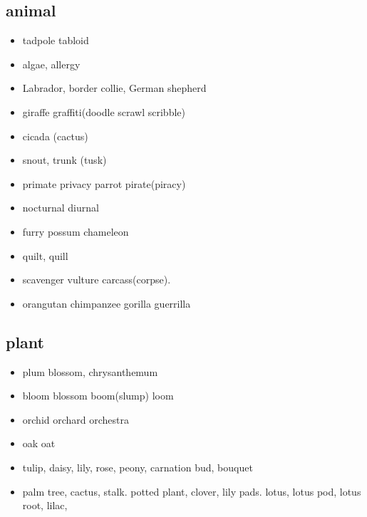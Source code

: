 \documentclass[a4paper,11pt,twoside]{book}
\begin{document}
\subsection{animal}
\begin{itemize}
	\item tadpole tabloid
	
	\item algae, allergy 
	
	\item Labrador, border collie, German shepherd
	\item giraffe graffiti(doodle scrawl scribble) 
	
	\item cicada (cactus)
	
	\item snout, trunk (tusk)
	
	\item primate privacy parrot pirate(piracy)
		
	\item nocturnal diurnal
		
	\item furry possum chameleon 
	
	\item quilt, quill
	
	\item scavenger vulture carcass(corpse).
	
	\item orangutan chimpanzee gorilla guerrilla 
\end{itemize}

\subsection{plant}
\begin{itemize}
	\item plum blossom, chrysanthemum
	
	\item bloom blossom boom(slump) loom
	
	\item orchid orchard orchestra
	
	\item oak oat
	
	\item tulip, daisy, lily, rose, peony, carnation bud, bouquet 
	
	\item palm tree, cactus, stalk. potted plant, clover, lily pads. lotus, lotus pod, lotus root, lilac,
	
	
\end{itemize}
\end{document}
